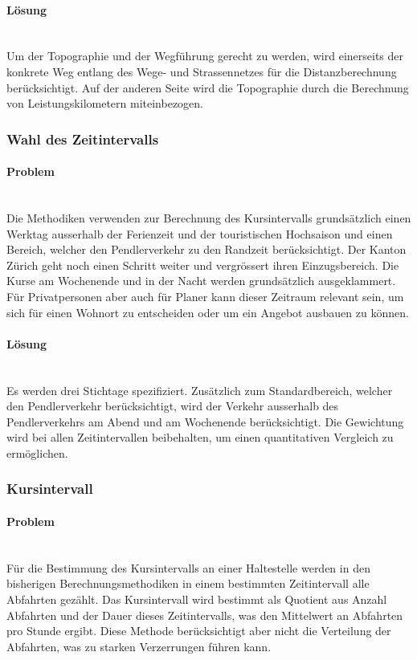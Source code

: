 \paragraph{Lösung}~\\
Um der Topographie und der Wegführung gerecht zu werden, wird einerseits der konkrete Weg entlang des Wege- und Strassennetzes für die Distanzberechnung berücksichtigt.
Auf der anderen Seite wird die Topographie durch die Berechnung von \gls{Leistungskilometer}n miteinbezogen.

\subsubsection{Wahl des Zeitintervalls}
\label{Verbesserungsmöglichkeiten:Wahl des Zeitintervalls}

\paragraph{Problem}~\\
Die Methodiken verwenden zur Berechnung des Kursintervalls grundsätzlich einen Werktag ausserhalb der Ferienzeit und der touristischen Hochsaison und einen Bereich, welcher den Pendlerverkehr zu den Randzeit berücksichtigt.
Der Kanton Zürich geht noch einen Schritt weiter und vergrössert ihren Einzugsbereich.
Die Kurse am Wochenende und in der Nacht werden grundsätzlich ausgeklammert.
Für Privatpersonen aber auch für Planer kann dieser Zeitraum relevant sein, um sich für einen Wohnort zu entscheiden oder um ein Angebot ausbauen zu können.

\paragraph{Lösung}~\\
Es werden drei Stichtage spezifiziert.
Zusätzlich zum Standardbereich, welcher den Pendlerverkehr berücksichtigt, wird der Verkehr ausserhalb des Pendlerverkehrs am Abend und am Wochenende berücksichtigt.
Die Gewichtung wird bei allen Zeitintervallen beibehalten, um einen quantitativen Vergleich zu ermöglichen.

\subsubsection{Kursintervall}
\label{Verbesserungsmöglichkeiten:Kursintervall}

\paragraph{Problem}~\\
Für die Bestimmung des Kursintervalls an einer \gls{Haltestelle} werden in den bisherigen Berechnungsmethodiken in einem bestimmten Zeitintervall alle Abfahrten gezählt. Das Kursintervall wird bestimmt als Quotient aus Anzahl Abfahrten und der Dauer dieses Zeitintervalls, was den Mittelwert an Abfahrten pro Stunde ergibt.
Diese Methode berücksichtigt aber nicht die Verteilung der Abfahrten, was zu starken Verzerrungen führen kann.

